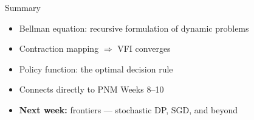 \documentclass[aspectratio=169, 10pt]{beamer}
\begin{document}
\begin{frame}{Summary}
\begin{itemize}\item Bellman equation: recursive formulation of dynamic problems\item Contraction mapping $\Rightarrow$ VFI converges\item Policy function: the optimal decision rule\item Connects directly to PNM Weeks 8--10\item \textbf{Next week:} frontiers --- stochastic DP, SGD, and beyond\end{itemize}
\end{frame}
\end{document}
